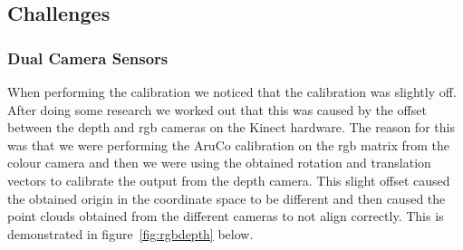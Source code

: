 \documentclass{article}
\begin{document}
\subsection{Challenges}
\subsubsection{Dual Camera Sensors}
When performing the calibration we noticed that the calibration was slightly off. After doing some research we worked out that this was caused by the offset between the depth and rgb cameras on the Kinect hardware. The reason for this was that we were performing the AruCo calibration on the rgb matrix from the colour camera and then we were using the obtained rotation and translation vectors to calibrate the output from the depth camera. This slight offset caused the obtained origin in the coordinate space to be different and then caused the point clouds obtained from the different cameras to not align correctly. This is demonstrated in figure~\ref{fig:rgbdepth} below.
\end{document}
